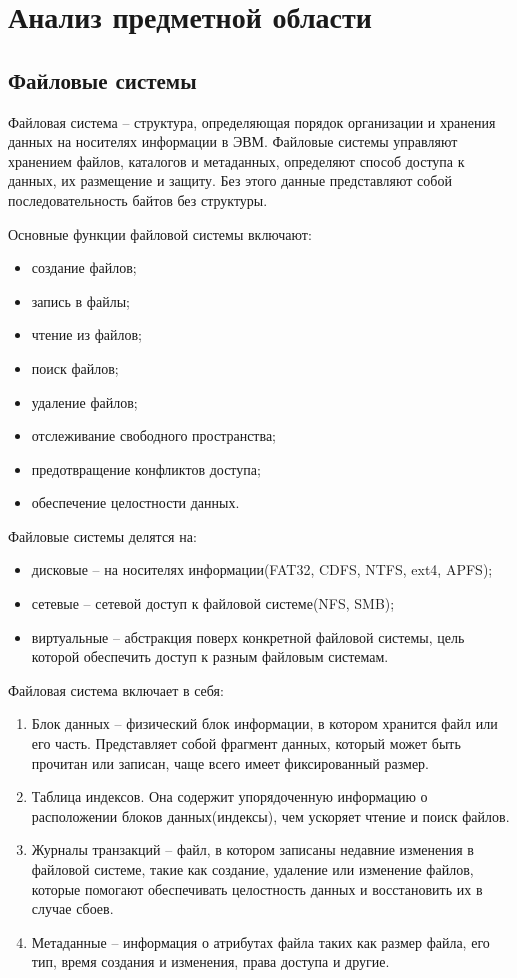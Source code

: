 \section{Анализ предметной области}
\subsection{Файловые системы}

Файловая система -- структура, определяющая порядок организации и хранения данных на носителях информации в ЭВМ. Файловые системы управляют хранением файлов, каталогов и метаданных, определяют способ доступа к данных, их размещение и защиту. Без этого данные представляют собой последовательность байтов без структуры.

Основные функции файловой системы включают:

\begin{itemize}
\item создание файлов;
\item запись в файлы;
\item чтение из файлов;
\item поиск файлов;
\item удаление файлов;
\item отслеживание свободного пространства;
\item предотвращение конфликтов доступа;
\item обеспечение целостности данных.
\end{itemize}

Файловые системы делятся на:

\begin{itemize}
\item дисковые -- на носителях информации(FAT32, CDFS, NTFS, ext4, APFS);
\item сетевые -- сетевой доступ к файловой системе(NFS, SMB);
\item виртуальные -- абстракция поверх конкретной файловой системы, цель которой обеспечить доступ к разным файловым системам.
\end{itemize}

Файловая система включает в себя:

\begin{enumerate}
\item Блок данных -- физический блок информации, в котором хранится файл или его часть. Представляет собой фрагмент данных, который может быть прочитан или записан, чаще всего имеет фиксированный размер.
\item Таблица индексов. Она содержит упорядоченную информацию о расположении блоков данных(индексы), чем ускоряет чтение и поиск файлов.
\item Журналы транзакций -- файл, в котором записаны недавние изменения в файловой системе, такие как создание, удаление или изменение файлов, которые помогают обеспечивать целостность данных и восстановить их в случае сбоев.
\item Метаданные -- информация о атрибутах файла таких как размер файла, его тип, время создания и изменения, права доступа и другие.
\end{enumerate}

